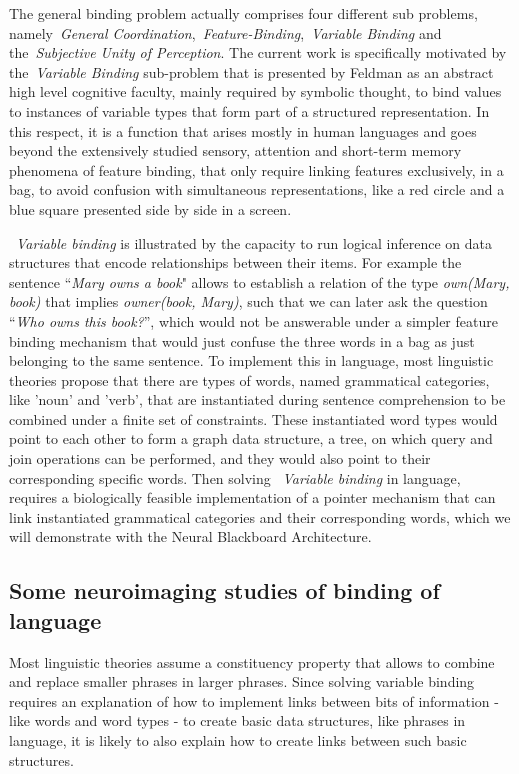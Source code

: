 \documentclass[10pt]{article}
\begin{document}
The general binding problem actually comprises four different sub problems, namely~\emph{General Coordination},~\emph{Feature-Binding},~\emph{Variable Binding} and the~\emph{Subjective Unity of Perception}\cite{Feldman_2012}.
The current work is specifically motivated by the~\emph{Variable Binding} sub-problem that is presented by Feldman as an abstract high level cognitive faculty, mainly required by symbolic thought, to bind values to instances of variable types that form part of a structured representation.
In this respect, it is a function that arises mostly in human languages and goes beyond the extensively studied sensory, attention and short-term memory phenomena of feature binding, that only require linking features exclusively, in a bag, to avoid confusion with simultaneous representations, like a red circle and a blue square presented side by side in a screen.

~\emph{Variable binding} is illustrated by the capacity to run logical inference on data structures that encode relationships between their items.
For example the sentence ``\emph{Mary owns a book}" allows to establish a relation of the type \emph{own(Mary, book)} that implies \emph{owner(book, Mary)}, such that we can later ask the question ``\emph{Who owns this book?}'', which would not be answerable under a simpler feature binding mechanism that would just confuse the three words in a bag as just belonging to the same sentence.
To implement this in language, most linguistic theories propose that there are types of words, named grammatical categories, like 'noun' and 'verb', that are instantiated during sentence comprehension to be combined under a finite set of constraints.
These instantiated word types would point to each other to form a graph data structure, a tree, on which query and join operations can be performed, and they would also point to their corresponding specific words.
Then solving ~\emph{Variable binding} in language, requires a biologically feasible implementation of a pointer mechanism that can link instantiated grammatical categories and their corresponding words, which we will demonstrate with the Neural Blackboard Architecture.


\subsection{Some neuroimaging studies of binding of language}
{\label{intro:imaging}}

Most linguistic theories assume a constituency property that allows to combine and replace smaller phrases in larger phrases.
Since solving variable binding requires an explanation of how to implement links between bits of information - like words and word types - to create basic data structures, like phrases in language, it is likely to also explain how to create links between such basic structures.
\end{document}
